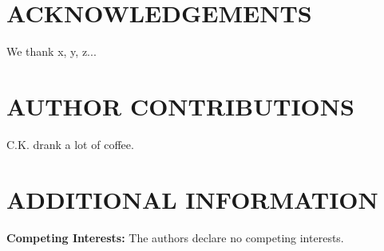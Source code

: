 \documentclass[prd,twocolumn,tightenlines,preprintnumbers,showpacs,superscriptaddress,notitlepage,nofootinbib,eqsecnum,floatfix,longbibliography]{revtex4}
\begin{document}
\section{ACKNOWLEDGEMENTS}

We thank x, y, z...

\section{AUTHOR CONTRIBUTIONS}

C.K. drank a lot of coffee.

\section{ADDITIONAL INFORMATION}

\textbf{Competing Interests:} The authors declare no competing interests.


\end{document}
